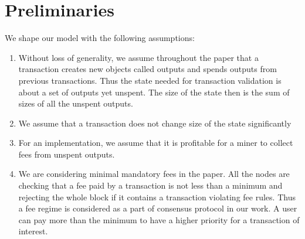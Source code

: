 \documentclass[]{llncs}   %
\begin{document}

\section{Preliminaries}
\label{sec:preliminaries}

We shape our model with the following assumptions:
\begin{enumerate}[label=\textbf{A\arabic*. }]
  \item Without loss of generality, we assume throughout the paper that a transaction creates new objects called outputs and spends outputs from previous transactions. Thus the state needed for transaction validation is about a set of outputs yet unspent. The size of the state then is the sum of sizes of all the unspent outputs.  
  \item We assume that a transaction does not change size of the state significantly
  \item For an implementation, we assume that it is profitable for a miner to collect fees from unspent outputs. 
  \item We are considering minimal mandatory fees in the paper. All the nodes
      are checking that a fee paid by a transaction is not less than a minimum
      and rejecting the whole block if it contains a transaction violating fee
      rules. Thus a fee regime is considered as a part of consensus protocol in
      our work. A user can pay more than the minimum to have a higher priority
      for a transaction of interest.
\end{enumerate}
\end{document}

